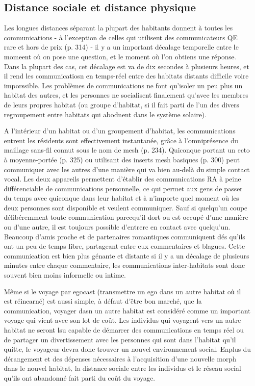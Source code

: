 \subsection{Distance sociale et distance physique} \label{sec:real-social-distance} 

Les longues distances séparant la plupart des habitants donnent à toutes les communications - à l'exception de celles qui utilisent des communicateurs QE rare et hors de prix (p. 314) - il y a un important décalage temporelle entre le momeent où on pose une question, et le moment où l'on obtiens une réponse. Dans la plupart des cas, cet décalage est va de dix secondes à plusieurs heures, et il rend les communicatiosn en temps-réel entre des habitats distants difficile voire imporssible. Les problèmes de communications ne font qu'isoler un peu plus un habitat des autres, et les personnes ne socialisent finalement qu'avec les membres de leurs propres habitat (ou groupe d'habitat, si il fait parti de l'un des divers regroupement entre habitats qui abodnent dans le système solaire). 

A l'intérieur d'un habitat ou d'un groupement d'habitat, les communications entrent les résidents sont effectivement instantanée, grâce à l'omniprésence du maillage sans-fil connut sous le nom de mesh (p. 234). Quiconque portant un ecto à moyenne-portée (p. 325) ou utilisant des inserts mesh basiques (p. 300) peut communiquer avec les autres d'une manière qui va bien au-delà du simple contact vocal. Les deux appareils permettent d'établir des communications RA à peine différenciable de communications personnelle, ce qui permet aux gens de passer du temps avec quiconque dans leur habitat et à n'importe quel moment où les deux personnes sont disponible et veulent communiquer. Sauf si quelqu'un coupe délibéremment toute communication parcequ'il dort ou est occupé d'une manière ou d'une autre, il est toujours possible d'entrere en contact avec quelqu'un. Beaucoup d'amis proche et de partenaires romantiques communiquent dés qu'ils ont un peu de temps libre, partageant entre eux commentaires et blagues. Cette communication est bien plus génante et distante si il y a un décalage de plusieurs minutes entre chaque commentaire, les communications inter-habitats sont donc souvent bien moins informelle ou intime. 

Même si le voyage par egocast (transmettre un ego dans un autre habitat où il est réincarné) est aussi simple, à défaut d'être bon marché, que la communication, voyager dasn un autre habitat est considéré comme un important voyage qui vient avec son lot de coût. Les individus qui voyagent vers un autre habitat ne seront lsu capable de démarrer des communications en temps réel ou de partager un divertissement avec les personnes qui sont dans l'habitat qu'il quitte, le voyageur devra donc trouver un nouvel environnement social. Enplus du dérangement et des dépenses nécessaires à l'acquisition d'une nouvelle morph dans le nouvel habitat, la distance sociale entre les individus et le réseau social qu'ils ont abandonné fait parti du coût du voyage. 

